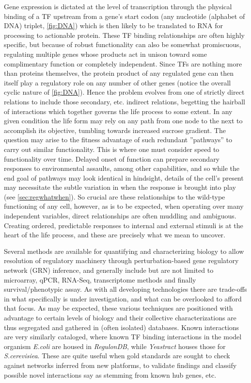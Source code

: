 Gene expression is dictated at the level of transcription through the physical binding of a TF upstream from a gene's start codon (any nucleotide (alphabet of DNA) triplet, \cref{fig:DNA}) which is then likely to be translated to RNA for processing to actionable protein. These TF binding relationships are often highly specific, but because of robust functionality can also be somewhat promiscuous, regulating multiple genes whose products act in unison toward some complimentary function or completely independent. Since TFs are nothing more than proteins themselves, the protein product of any regulated gene can then itself play a regulatory role on any number of other genes (notice the overall cyclic nature of \cref{fig:DNA}). Hence the problem evolves from one of strictly direct relations to include those secondary, etc. indirect relations, begetting the hairball of interactions which together governs the life process to some extent. In any given condition the life form may rely on any path from one node to the next to accomplish its objective, \eg tumbling towards increased sucrose gradient. The question may arise to the fitness advantage of such redundant ''pathways'' to carry out similar functionality. This is where one must consider speed to functionality over time. Delayed onset of function can prepare secondary responses to environmental assaults, among other capabilities, and so while the end goal of pathways may look identical in hindsight, details of the cell's present may necessitate the subtle variation in when the response is brought into play (see \cref{sec:regwhatwhen}). So crucial are these relationships to the wild-type functioning of any cell, however, as is to be expected, when operating over many independent variables, direct relationships are often muddling and ambiguous. Creating ordered, predictable responses to internal and external stimuli is at the heart of the life process, and these are precisely what we mean to uncover.

Several methods are available for quantifying and characterizing biology to allow resolution of regulatory machinery through perturbation-based gene regulatory network (GRN) inference, and generally include but are not limited to microarray, qPCR, RNA-Seq, transcriptome methods and finally survival/phenotypic assay. As with all developing technologies there are trade-offs in what specifically is under investigation, and what can be overlooked to afford that focus. As may be expected, these various techniques are positioned with advantage to certain levels of biology and their collective characterizations are thus segregated and gathered in (often isolated) databases. Known interactions are very similarly cataloged, where known TF binding interactions in the model organism \emph{E.coli} are housed in \emph{RegulonDB}\cite{gama2008regulondb}, while \emph{Yeastract}\cite{teixeira2006yeastract} houses those for \emph{S.cerevisiea}. These are quite useful when gold standards are sought to check against networks inferred from new platforms, to validate findings and classify possible novel interactions \eg say as stemming from known hub genes, etc.

